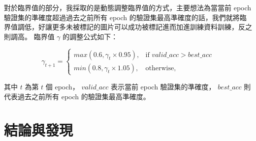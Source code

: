 \documentclass[a4paper,12pt]{article}   %
\begin{document}
	對於臨界值的部分，我採取的是動態調整臨界值的方式，主要想法為當當前 epoch 驗證集的準確度超過過去之前所有 epoch 的驗證集最高準確度的話，我們就將臨界值調低，好讓更多未被標記的圖片可以成功被標記進而加進訓練資料訓練，反之則調高。 臨界值 $\gamma$ 的調整公式如下：

\begin{equation}
  \label{eqn:dt}  
  \gamma_{t+1} = \left\{\begin{array}{ll}
                 max(0.6, \gamma_t \times 0.95 ), & \mbox{if $valid\_acc > best\_acc$} \\ 
                 min(0.8, \gamma_t \times 1.05 ), & \mbox{otherwise,}  
                \end{array} \right. 
\end{equation}
	
	其中 $t$ 為第 $t$ 個 epoch， $valid\_acc$ 表示當前 epoch 驗證集的準確度， $best\_acc$ 則代表過去之前所有 epoch 的驗證集最高準確度。


\begin{table}[htb]
	\centering	
	\normalsize
    \newcommand{\z}{\phantom{0}}
    \caption{Configurations of optimizer and learning rate scheduler}
    \vspace{0.15\baselineskip}
	\label{table:config2}
   \vspace{0.1\baselineskip}
\end{table}



\section{結論與發現}
\end{document}
